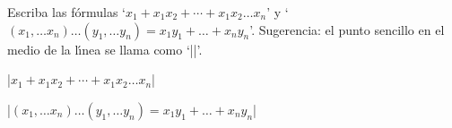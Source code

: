 

\bigskip

\enunciadoS Escriba las f\'ormulas 
`$x_1+x_1x_2+\cdots+x_1x_2\ldots x_n$' y 
`$(x_1,\ldots x_n)\ldots(y_1,\ldots y_n) = x_1y_1+\ldots+x_ny_n$'.
Sugerencia: el punto sencillo en el medio de la l\'{\i}nea se 
llama como `|\cdot|'.

\bigskip

\respuestaS

|$x_1+x_1x_2+\cdots+x_1x_2\ldots x_n$|

|$(x_1,\ldots x_n)\ldots(y_1,\ldots y_n) = x_1y_1+\ldots+x_ny_n$|

\bye


